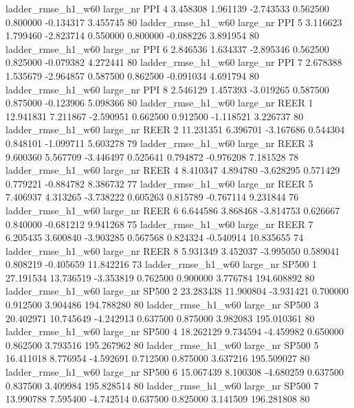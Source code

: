  ladder_rmse_h1_w60   large_nr      PPI                 4  3.458308  1.961139  -2.743533 0.562500 0.800000 -0.134317    3.455745 80
 ladder_rmse_h1_w60   large_nr      PPI                 5  3.116623  1.799460  -2.823714 0.550000 0.800000 -0.088226    3.891954 80
 ladder_rmse_h1_w60   large_nr      PPI                 6  2.846536  1.634337  -2.895346 0.562500 0.825000 -0.079382    4.272441 80
 ladder_rmse_h1_w60   large_nr      PPI                 7  2.678388  1.535679  -2.964857 0.587500 0.862500 -0.091034    4.691794 80
 ladder_rmse_h1_w60   large_nr      PPI                 8  2.546129  1.457393  -3.019265 0.587500 0.875000 -0.123906    5.098366 80
 ladder_rmse_h1_w60   large_nr     REER                 1 12.941831  7.211867  -2.590951 0.662500 0.912500 -1.118521    3.226737 80
 ladder_rmse_h1_w60   large_nr     REER                 2 11.231351  6.396701  -3.167686 0.544304 0.848101 -1.099711    5.603278 79
 ladder_rmse_h1_w60   large_nr     REER                 3  9.600360  5.567709  -3.446497 0.525641 0.794872 -0.976208    7.181528 78
 ladder_rmse_h1_w60   large_nr     REER                 4  8.410347  4.894780  -3.628295 0.571429 0.779221 -0.884782    8.386732 77
 ladder_rmse_h1_w60   large_nr     REER                 5  7.406937  4.313265  -3.738222 0.605263 0.815789 -0.767114    9.231844 76
 ladder_rmse_h1_w60   large_nr     REER                 6  6.644586  3.868468  -3.814753 0.626667 0.840000 -0.681212    9.941268 75
 ladder_rmse_h1_w60   large_nr     REER                 7  6.205435  3.600840  -3.903285 0.567568 0.824324 -0.540914   10.835655 74
 ladder_rmse_h1_w60   large_nr     REER                 8  5.931349  3.452037  -3.995050 0.589041 0.808219 -0.405659   11.842216 73
 ladder_rmse_h1_w60   large_nr    SP500                 1 27.191534 13.736519  -3.353819 0.762500 0.900000  3.776784  194.608892 80
 ladder_rmse_h1_w60   large_nr    SP500                 2 23.283438 11.900804  -3.931421 0.700000 0.912500  3.904486  194.788280 80
 ladder_rmse_h1_w60   large_nr    SP500                 3 20.402971 10.745649  -4.242913 0.637500 0.875000  3.982083  195.010361 80
 ladder_rmse_h1_w60   large_nr    SP500                 4 18.262129  9.734594  -4.459982 0.650000 0.862500  3.793516  195.267962 80
 ladder_rmse_h1_w60   large_nr    SP500                 5 16.411018  8.776954  -4.592691 0.712500 0.875000  3.637216  195.509027 80
 ladder_rmse_h1_w60   large_nr    SP500                 6 15.067439  8.100308  -4.680259 0.637500 0.837500  3.409984  195.828514 80
 ladder_rmse_h1_w60   large_nr    SP500                 7 13.990788  7.595400  -4.742514 0.637500 0.825000  3.141509  196.281808 80
